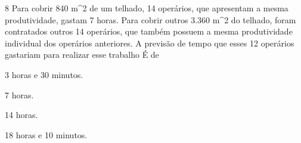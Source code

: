 





\num{8} Para cobrir 840 m^2 de um telhado, 14 operários, que apresentam a
mesma produtividade, gastam 7 horas. Para cobrir outros 3.360 m^2 do
telhado, foram contratados outros 14 operários, que também possuem a
mesma produtividade individual dos operários anteriores. A previsão de
tempo que esses 12 operários gastariam para realizar esse trabalho É de
\item 3 horas e 30 minutos.
\item 7 horas.
\item 14 horas.
\item 18 horas e 10 minutos.






